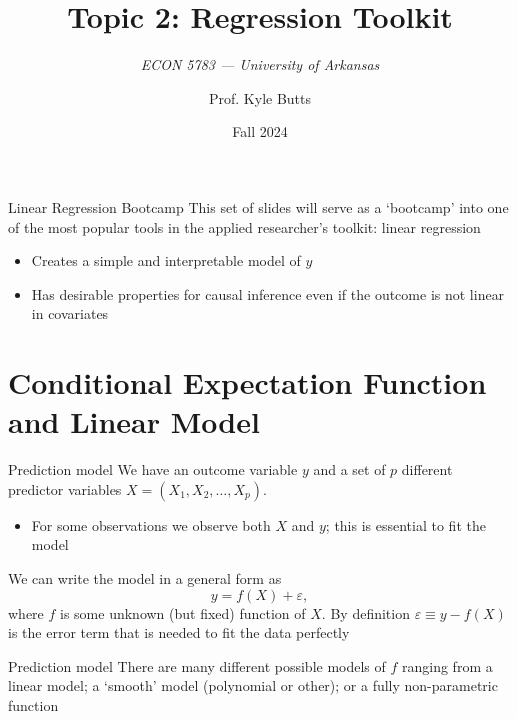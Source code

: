 \documentclass[aspectratio=169,t,11pt,table]{beamer}
\title{Topic 2: Regression Toolkit}
\subtitle{\it  ECON 5783 — University of Arkansas}
\date{Fall 2024}
\author{Prof. Kyle Butts}
\begin{document}
\begin{frame}
\maketitle

\end{frame}

\begin{frame}{Linear Regression Bootcamp}
  This set of slides will serve as a `bootcamp' into one of the most popular tools in the applied researcher's toolkit: linear regression
  \begin{itemize}
    \item Creates a simple and interpretable model of $y$
    
    \item Has desirable properties for causal inference even if the outcome is not linear in covariates
  \end{itemize}
\end{frame}

\section{Conditional Expectation Function and Linear Model}


\begin{frame}{Prediction model}
  We have an outcome variable $y$ and a set of $p$ different predictor variables $X = (X_1, X_2, \dots, X_p)$. 
  \begin{itemize}
    \item For some observations we observe both $X$ and $y$; this is essential to \alert{fit} the model
  \end{itemize}

  \bigskip
  We can write the model in a general form as
  $$
    y = f(X) + \varepsilon,
  $$
  where $f$ is some unknown (but fixed) function of $X$. By definition $\varepsilon \equiv y - f(X)$ is the \alert{error term} that is needed to fit the data perfectly
\end{frame}

\begin{frame}{Prediction model}
  There are many different possible models of $f$ ranging from a linear model; a `smooth' model (polynomial or other); or a fully non-parametric function
\end{frame}
\end{document}
